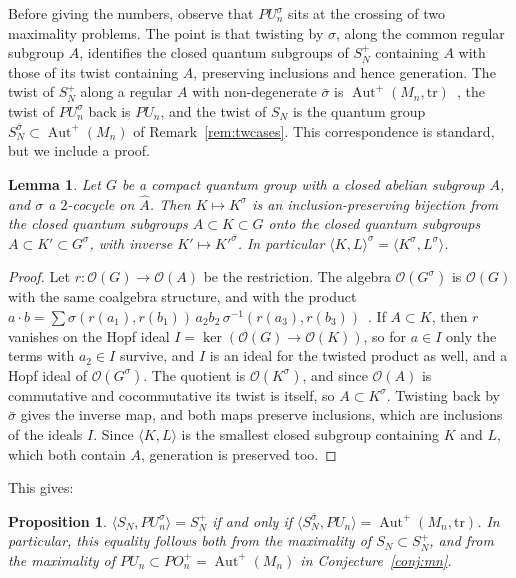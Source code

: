 \documentclass[11pt]{amsart}
\newtheorem{proposition}[theorem]{Proposition}
\newtheorem{lemma}[theorem]{Lemma}
\theoremstyle{definition}
\theoremstyle{remark}
\theoremstyle{plain}
\numberwithin{equation}{section}
\numberwithin{table}{section}
\DeclareMathOperator{\Aut}{Aut}
\begin{document}
Before giving the numbers, observe that $PU_n^\sigma$ sits at the crossing of two maximality problems. The point is that twisting by $\sigma$, along the common regular subgroup $A$, identifies the closed quantum subgroups of $S_N^+$ containing $A$ with those of its twist containing $A$, preserving inclusions and hence generation. The twist of $S_N^+$ along a regular $A$ with non-degenerate $\bar\sigma$ is $\Aut^+(M_n,\mathrm{tr})$~\cite{bbcu}, the twist of $PU_n^\sigma$ back is $PU_n$, and the twist of $S_N$ is the quantum group $S_N^{\bar\sigma}\subset\Aut^+(M_n)$ of Remark~\ref{rem:twcases}. This correspondence is standard, but we include a proof.

\begin{lemma}\label{lem:twcorr}
Let $G$ be a compact quantum group with a closed abelian subgroup $A$, and $\sigma$ a $2$-cocycle on $\widehat A$. Then $K\mapsto K^\sigma$ is an inclusion-preserving bijection from the closed quantum subgroups $A\subset K\subset G$ onto the closed quantum subgroups $A\subset K'\subset G^\sigma$, with inverse $K'\mapsto K'^{\bar\sigma}$. In particular $\langle K,L\rangle^\sigma=\langle K^\sigma,L^\sigma\rangle$.
\end{lemma}

\begin{proof}
Let $r:\mathcal O(G)\to\mathcal O(A)$ be the restriction. The algebra $\mathcal O(G^\sigma)$ is $\mathcal O(G)$ with the same coalgebra structure, and with the product $a\cdot b=\sum\sigma(r(a_1),r(b_1))\,a_2b_2\,\sigma^{-1}(r(a_3),r(b_3))$~\cite{doi}. If $A\subset K$, then $r$ vanishes on the Hopf ideal $I=\ker(\mathcal O(G)\to\mathcal O(K))$, so for $a\in I$ only the terms with $a_2\in I$ survive, and $I$ is an ideal for the twisted product as well, and a Hopf ideal of $\mathcal O(G^\sigma)$. The quotient is $\mathcal O(K^\sigma)$, and since $\mathcal O(A)$ is commutative and cocommutative its twist is itself, so $A\subset K^\sigma$. Twisting back by $\bar\sigma$ gives the inverse map, and both maps preserve inclusions, which are inclusions of the ideals $I$. Since $\langle K,L\rangle$ is the smallest closed subgroup containing $K$ and $L$, which both contain $A$, generation is preserved too.
\end{proof}

This gives:

\begin{proposition}\label{prop:crossing}
$\langle S_N,PU_n^\sigma\rangle=S_N^+$ if and only if $\langle S_N^{\bar\sigma},PU_n\rangle=\Aut^+(M_n,\mathrm{tr})$. In particular, this equality follows both from the maximality of $S_N\subset S_N^+$, and from the maximality of $PU_n\subset PO_n^+=\Aut^+(M_n)$ in Conjecture~\ref{conj:mn}.
\end{proposition}
\end{document}
